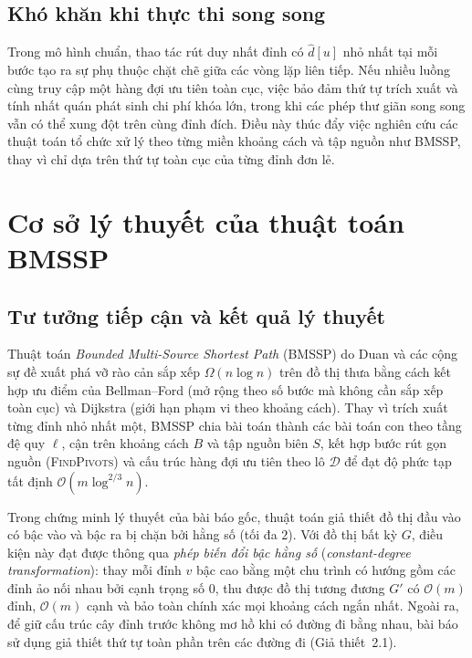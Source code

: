 \subsection{Khó khăn khi thực thi song song}

Trong mô hình chuẩn, thao tác rút duy nhất đỉnh có $\widehat{d}[u]$ nhỏ nhất tại mỗi bước tạo ra sự phụ thuộc chặt chẽ giữa các vòng lặp liên tiếp. Nếu nhiều luồng cùng truy cập một hàng đợi ưu tiên toàn cục, việc bảo đảm thứ tự trích xuất và tính nhất quán phát sinh chi phí khóa lớn, trong khi các phép thư giãn song song vẫn có thể xung đột trên cùng đỉnh đích. Điều này thúc đẩy việc nghiên cứu các thuật toán tổ chức xử lý theo từng miền khoảng cách và tập nguồn như BMSSP, thay vì chỉ dựa trên thứ tự toàn cục của từng đỉnh đơn lẻ.

\section{Cơ sở lý thuyết của thuật toán BMSSP}
\label{sec:ly-thuyet-bmssp}

\subsection{Tư tưởng tiếp cận và kết quả lý thuyết}

Thuật toán \textit{Bounded Multi-Source Shortest Path} (BMSSP) do Duan và các cộng sự đề xuất \cite{duan2025breaking} phá vỡ rào cản sắp xếp $\Omega(n\log n)$ trên đồ thị thưa bằng cách kết hợp ưu điểm của Bellman--Ford \cite{bellman1958routing}(mở rộng theo số bước mà không cần sắp xếp toàn cục) và Dijkstra (giới hạn phạm vi theo khoảng cách). Thay vì trích xuất từng đỉnh nhỏ nhất một, BMSSP chia bài toán thành các bài toán con theo tầng đệ quy $\ell$, cận trên khoảng cách $B$ và tập nguồn biên $S$, kết hợp bước rút gọn nguồn (\textsc{FindPivots}) và cấu trúc hàng đợi ưu tiên theo lô $\mathcal{D}$ để đạt độ phức tạp tất định $\mathcal{O}(m\log^{2/3}n)$.

Trong chứng minh lý thuyết của bài báo gốc, thuật toán giả thiết đồ thị đầu vào có bậc vào và bậc ra bị chặn bởi hằng số (tối đa $2$). Với đồ thị bất kỳ $G$, điều kiện này đạt được thông qua \textit{phép biến đổi bậc hằng số} (\textit{constant-degree transformation})\cite{frederickson1983data}: thay mỗi đỉnh $v$ bậc cao bằng một chu trình có hướng gồm các đỉnh ảo nối nhau bởi cạnh trọng số $0$, thu được đồ thị tương đương $G'$ có $\mathcal{O}(m)$ đỉnh, $\mathcal{O}(m)$ cạnh và bảo toàn chính xác mọi khoảng cách ngắn nhất. Ngoài ra, để giữ cấu trúc cây đỉnh trước không mơ hồ khi có đường đi bằng nhau, bài báo sử dụng giả thiết thứ tự toàn phần trên các đường đi (Giả thiết~2.1).

